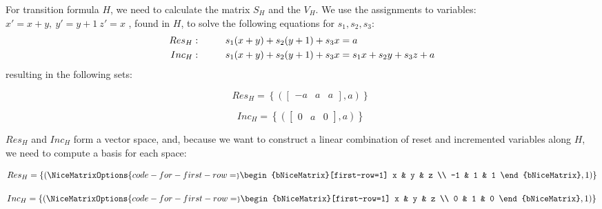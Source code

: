 For transition formula $H$, we need to calculate the matrix $S_H$ and the \qvasr $V_H$.
We use the assignments to variables: $x' = x + y, \ y'= y + 1\ z' = x$ , found in $H$, to solve the following equations for $s_1, s_2,  s_3$:
\begin{align*}
	Res_H:& \hspace*{1cm} s_1(x + y) + s_2(y + 1) + s_3x = a \\
	Inc_H:& \hspace*{1cm} s_1(x + y) + s_2(y + 1) + s_3x = s_1x + s_2y + s_3z + a
\end{align*}
resulting in the following sets:
\vspace*{-0.5em}
\begin{center}
	\begin{minipage}{0.5\linewidth}
		\begin{equation*}
			Res_H = \left\{ (\begin{bmatrix} -a & a & a \end{bmatrix}, a) \right\}\
		\end{equation*}
	\end{minipage}
	\begin{minipage}{0.4\linewidth}
		\begin{equation*}
			Inc_H = \left\{ (\begin{bmatrix} 0 & a & 0 \end{bmatrix}, a) \right\}\ 
		\end{equation*}
	\end{minipage}
\end{center}
$Res_H$ and $Inc_H$ form a vector space, and, because we want to construct a linear combination of reset and incremented variables along $H$, we need to compute a basis for each space:
\vspace*{-1em}
\begin{center}
	\begin{minipage}{0.5\linewidth}
		\begin{equation*}
			Res_H = \{(
			\NiceMatrixOptions{code-for-first-row=\scriptstyle}
			\begin{bNiceMatrix}[first-row=1]
				x & y & z \\
				-1 & 1 & 1 
			\end{bNiceMatrix}, 1)\}
		\end{equation*}
	\end{minipage}
	\begin{minipage}{0.4\linewidth}
		\begin{equation*}
			Inc_H = \{(
			\NiceMatrixOptions{code-for-first-row=\scriptstyle}
			\begin{bNiceMatrix}[first-row=1] 
				x & y & z \\
				0 & 1 & 0 
			\end{bNiceMatrix}, 1)\}
		\end{equation*}
	\end{minipage}
\end{center}

